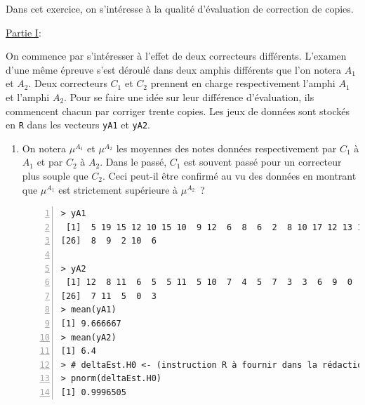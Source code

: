 \documentclass[10pt]{report}
\begin{document}
\begin{exercice}

Dans cet exercice, on s'intéresse à la qualité d'évaluation de correction de copies.

\noindent \underline{Partie I}:

On commence par s'intéresser à l'effet de deux correcteurs différents. L'examen d'une même épreuve s'est déroulé dans deux amphis différents que l'on notera $A_1$ et $A_2$. Deux correcteurs $C_1$ et $C_2$ prennent en charge respectivement l'amphi $A_1$ et l'amphi $A_2$. Pour se faire une idée sur leur différence d'évaluation, ils commencent chacun par corriger trente copies. Les jeux de données sont stockés en \texttt{R} dans les vecteurs \texttt{yA1} et \texttt{yA2}. 

\begin{enumerate}
\item On notera $\mu^{A_1}$ et $\mu^{A_2}$ les moyennes des notes données respectivement par $C_1$ à $A_1$ et par $C_2$ à $A_2$. Dans le passé, $C_1$ est souvent passé pour un correcteur plus souple que $C_2$. Ceci peut-il être confirmé au vu des données en montrant que $\mu^{A_1}$ est strictement supérieure à $\mu^{A_2}$~?


 
\IndicR
\begin{Verbatim}[frame=leftline,fontfamily=tt,fontshape=n,numbers=left]
> yA1
 [1]  5 19 15 12 10 15 10  9 12  6  8  6  2  8 10 17 12 13 11  6  9  9 11 12  8
[26]  8  9  2 10  6

> yA2
 [1] 12  8 11  6  5  5 11  5 10  7  4  5  7  3  3  6  9  0  6  0 10  6 14  5  8
[26]  7 11  5  0  3
> mean(yA1)
[1] 9.666667
> mean(yA2)
[1] 6.4
> # deltaEst.H0 <- (instruction R à fournir dans la rédaction)
> pnorm(deltaEst.H0)
[1] 0.9996505
\end{Verbatim}

 


\end{enumerate}
\end{exercice}
\end{document}
